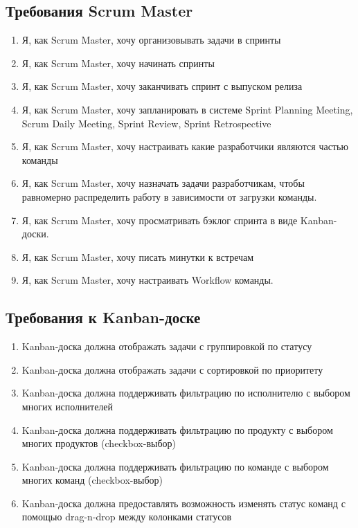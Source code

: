 \documentclass[14pt,a4paper]{extarticle}
\begin{document}
\subsection{Требования Scrum Master}
\begin{enumerate}[label=\textbf{SMR\arabic*}.]
	\item Я, как Scrum Master, хочу организовывать задачи в спринты
	\item Я, как Scrum Master, хочу начинать спринты
	\item Я, как Scrum Master, хочу заканчивать спринт с выпуском релиза
	\item Я, как Scrum Master, хочу запланировать в системе
	      Sprint Planning Meeting, Scrum Daily Meeting, Sprint Review, Sprint Retrospective
	\item Я, как Scrum Master, хочу настраивать какие разработчики являются частью команды
	\item Я, как Scrum Master, хочу назначать задачи разработчикам, чтобы равномерно распределить работу в зависимости от загрузки команды.
	\item Я, как Scrum Master, хочу просматривать бэклог спринта в виде Kanban-доски.
	\item Я, как Scrum Master, хочу писать минутки к встречам
	\item Я, как Scrum Master, хочу настраивать Workflow команды.
\end{enumerate}

\subsection{Требования к Kanban-доске}
\begin{enumerate}[label=\textbf{KBR\arabic*}.]
	\item Kanban-доска должна отображать задачи с группировкой по статусу
	\item Kanban-доска должна отображать задачи с сортировкой по приоритету
	\item Kanban-доска должна поддерживать фильтрацию по исполнителю с выбором
	      многих исполнителей
	\item Kanban-доска должна поддерживать фильтрацию по продукту с выбором
	      многих продуктов (checkbox-выбор)
	\item Kanban-доска должна поддерживать фильтрацию по команде с выбором
	      многих команд (checkbox-выбор)
	\item Kanban-доска должна предоставлять возможность изменять статус
	      команд с помощью drag-n-drop между колонками статусов
\end{enumerate}
\end{document}
